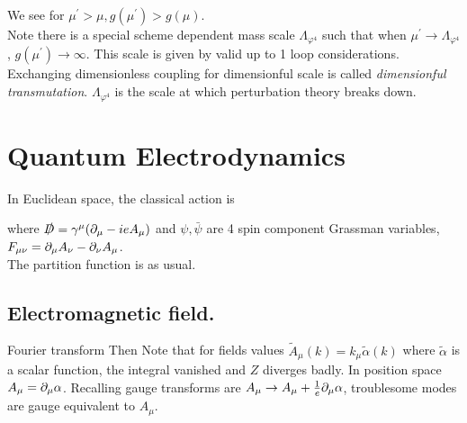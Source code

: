 \documentclass{article}
\begin{document}
We see for $\mu^\prime >  \mu, g(\mu^\prime) > g(\mu)$. \\
Note there is a special scheme dependent mass scale $\Lambda_{\varphi^4}$ such that when $\mu^\prime \to \Lambda_{\varphi^4}$, $g(\mu^\prime) \to \infty$. This scale is given by 
valid up to 1 loop considerations. 
Exchanging dimensionless coupling for dimensionful scale is called \emph{ dimensionful transmutation}. $\Lambda_{\varphi^4}$ is the scale at which perturbation theory breaks down. 

\section{Quantum Electrodynamics}
In Euclidean space, the classical action is 

where $\slashed{D} = \gamma^\mu (\partial_\mu - ieA_\mu)$ and $\psi,\bar{\psi}$ are 4 spin component Grassman variables, $F_{\mu\nu} = \partial_\mu A_\nu - \partial_\nu A_\mu$. \\
The partition function is
as usual. 

\subsection{Electromagnetic field. }

Fourier transform 
Then 
Note that for fields values $\tilde{A}_\mu(k) = k_\mu \tilde{\alpha}(k)$ where $\tilde{\alpha}$ is a scalar function, the integral vanished and $Z$ diverges badly. In position space $A_\mu = \partial_\mu \alpha$. Recalling gauge transforms are $A_\mu \to A_\mu + \frac{1}{e} \partial_\mu \alpha$, troublesome modes are gauge equivalent to $A_\mu$. 
\end{document}
